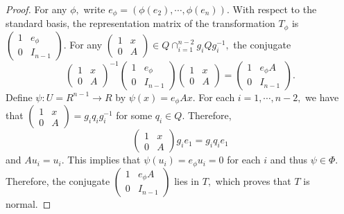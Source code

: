 \documentclass{gtpart}     %
\begin{document}
\begin{proof}
For any $\phi ,$ write $e_{\phi }=(\phi (e_{2}),\cdots ,\phi (e_{n})).$ With
respect to the standard basis, the representation matrix of the
transformation $T_{\phi }$ is $%
\begin{pmatrix}
1 & e_{\phi } \\
0 & I_{n-1}%
\end{pmatrix}%
.$ For any $%
\begin{pmatrix}
1 & x \\
0 & A%
\end{pmatrix}%
\in Q\cap _{i=1}^{n-2}g_{i}Qg_{i}^{-1},$ the conjugate
\begin{equation*}
\begin{pmatrix}
1 & x \\
0 & A%
\end{pmatrix}%
^{-1}%
\begin{pmatrix}
1 & e_{\phi } \\
0 & I_{n-1}%
\end{pmatrix}%
\begin{pmatrix}
1 & x \\
0 & A%
\end{pmatrix}%
=%
\begin{pmatrix}
1 & e_{\phi }A \\
0 & I_{n-1}%
\end{pmatrix}%
.
\end{equation*}%
Define $\psi :U=R^{n-1}\rightarrow R$ by $\psi (x)=e_{\phi }Ax.$ For each $%
i=1,\cdots ,n-2,$ we have that $%
\begin{pmatrix}
1 & x \\
0 & A%
\end{pmatrix}%
=g_{i}q_{i}g_{i}^{-1}$ for some $q_{i}\in Q.$ Therefore,
\begin{equation*}
\begin{pmatrix}
1 & x \\
0 & A%
\end{pmatrix}%
g_{i}e_{1}=g_{i}q_{i}e_{1}
\end{equation*}%
and $Au_{i}=u_{i}.$ This implies that $\psi (u_{i})=e_{\phi }u_{i}=0$ for
each $i$ and thus $\psi \in \Phi .$ Therefore, the conjugate $%
\begin{pmatrix}
1 & e_{\phi }A \\
0 & I_{n-1}%
\end{pmatrix}%
$ lies in $T,$ which proves that $T$ is normal.
\end{proof}

\bigskip
\end{document}
